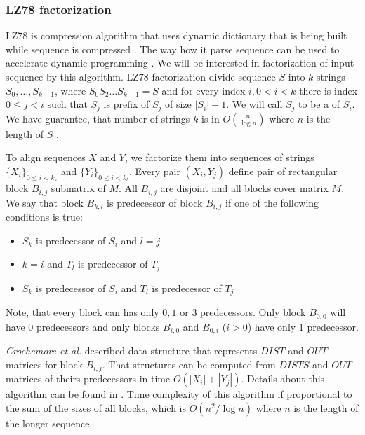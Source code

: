 \subsubsection{LZ78 factorization}

LZ78 is compression algorithm that uses dynamic dictionary that is being built
while sequence is compressed \cite{Lempel1976}. The way how it parse sequence
can be used to accelerate dynamic programming \cite{Crochemore2002,Weimann2009}. We will be interested in
factorization of input sequence by this algorithm. LZ78 factorization divide
sequence $S$ into $k$ strings $S_0,\dots,S_{k-1}$, where $S_0S_2\dots S_{k-1}=S$ and
for every index  $i,0< i <k$ there is index $0\leq j<i$ such that $S_j$ is
prefix of $S_j$ of size $|S_i|-1$. We will call $S_j$ to be a
 of $S_i$.  We have guarantee, that number of strings
$k$ is in  $O(\frac{n}{\log n})$ where $n$ is the length of $S$
\cite{Lempel1976}. 

To align sequences $X$ and $Y$, we factorize them into sequences of strings
$\{X_i\}_{0\leq i < k_s}$ and $\{Y_i\}_{0\leq i<k_t}$.  Every pair $(X_i,Y_j)$
define pair of rectangular block $B_{i,j}$ submatrix of $M$.  All $B_{i,j}$ are
disjoint and all blocks cover matrix $M$. We say that block $B_{k,l}$ is
predecessor of block $B_{i,j}$ if one of the following conditions is true:


\begin{itemize}
\item $S_k$ is predecessor of $S_i$ and $l=j$
\item $k=i$ and $T_l$ is predecessor of $T_j$
\item $S_k$ is predecessor of $S_i$ and $T_l$ is predecessor of $T_j$
\end{itemize}

Note, that every block can has only $0,1$ or $3$ predecessors. Only block
$B_{0,0}$ will have $0$ predecessors and only blocks $B_{i,0}$ and $B_{0,i}$
($i>0$) have only $1$ predecessor.  

{\it Crochemore et al.} described data structure that represents $DIST$ and $OUT$
matrices for block \nocite{Crochemore2002} $B_{i,j}$. That structures can be
computed from $DISTS$ and $OUT$ matrices of theirs predecessors in time
$O(|X_i|+|Y_j|)$. Details about this algorithm can be found in
\cite{Crochemore2002}. Time complexity of this algorithm if proportional to the
sum of the sizes of all blocks, which is $O(n^2/\log n)$ where $n$ is the length
of the longer sequence.

